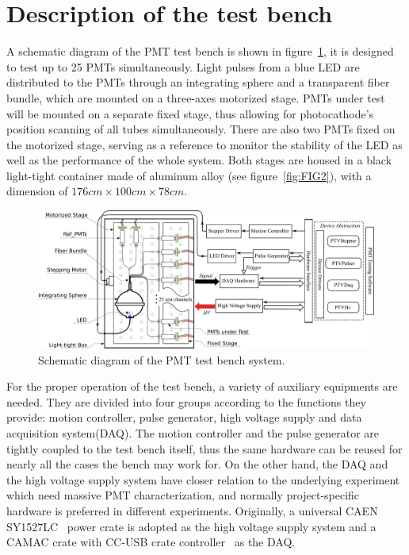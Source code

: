 \documentclass{JINST}
\begin{document}
\section{Description of the test bench}
\label{sec:description}

A schematic diagram of the PMT test bench is shown in figure~\ref{fig:FIG1}, it is designed to test up to 25 PMTs simultaneously.
Light pulses from a blue LED are distributed to the PMTs through an integrating sphere and a transparent fiber bundle, which are mounted on a three-axes motorized stage.
PMTs under test will be mounted on a separate fixed stage, thus allowing for photocathode's position scanning of all tubes simultaneously.
There are also two PMTs fixed on the motorized stage, serving as a reference to monitor the stability of the LED as well as the performance of the whole system.
Both stages are housed in a black light-tight container made of aluminum alloy (see figure~\ref{fig:FIG2}), with a dimension of $176cm\times100cm\times78cm$.

\begin{figure}[tbp]
	\centering
	\includegraphics[width=140mm]{FIG1}
	\caption{Schematic diagram of the PMT test bench system.}
	\label{fig:FIG1}
\end{figure}

For the proper operation of the test bench, a variety of auxiliary equipments are needed. 
They are divided into four groups according to the functions they provide: motion controller, pulse generator, high voltage supply and data acquisition system(DAQ).
The motion controller and the pulse generator are tightly coupled to the test bench itself, thus the same hardware can be reused for nearly all the cases the bench may work for.
On the other hand, the DAQ and the high voltage supply system have closer relation to the underlying experiment which need massive PMT characterization, and normally project-specific hardware is preferred in different experiments. 
Originally, a universal CAEN SY1527LC~\cite{sy1527lc} power crate is adopted as the high voltage supply system and a CAMAC crate with CC-USB crate controller~\cite{cc_usb} as the DAQ.
	
\end{document}
